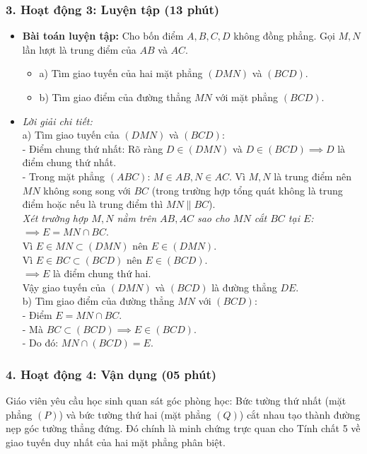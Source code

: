 \documentclass[12pt, a4paper]{article}
\begin{document}
\subsubsection*{3. Hoạt động 3: Luyện tập (13 phút)}
\begin{itemize}
    \item \textbf{Bài toán luyện tập:} Cho bốn điểm $A, B, C, D$ không đồng phẳng. Gọi $M, N$ lần lượt là trung điểm của $AB$ và $AC$.
    \begin{itemize}
        \item a) Tìm giao tuyến của hai mặt phẳng $(DMN)$ và $(BCD)$.
        \item b) Tìm giao điểm của đường thẳng $MN$ với mặt phẳng $(BCD)$.
    \end{itemize}
    \item \textit{Lời giải chi tiết:}\\
    a) Tìm giao tuyến của $(DMN)$ và $(BCD)$:\\
    - Điểm chung thứ nhất: Rõ ràng $D \in (DMN)$ và $D \in (BCD) \implies D$ là điểm chung thứ nhất.\\
    - Trong mặt phẳng $(ABC)$: $M \in AB, N \in AC$. Vì $M, N$ là trung điểm nên $MN$ không song song với $BC$ (trong trường hợp tổng quát không là trung điểm hoặc nếu là trung điểm thì $MN \parallel BC$).\\
    \textit{Xét trường hợp $M, N$ nằm trên $AB, AC$ sao cho $MN$ cắt $BC$ tại $E$:}\\
    $\implies E = MN \cap BC$.\\
    Vì $E \in MN \subset (DMN)$ nên $E \in (DMN)$.\\
    Vì $E \in BC \subset (BCD)$ nên $E \in (BCD)$.\\
    $\implies E$ là điểm chung thứ hai.\\
    Vậy giao tuyến của $(DMN)$ và $(BCD)$ là đường thẳng $DE$.\\
    b) Tìm giao điểm của đường thẳng $MN$ với $(BCD)$:\\
    - Điểm $E = MN \cap BC$.\\
    - Mà $BC \subset (BCD) \implies E \in (BCD)$.\\
    - Do đó: $MN \cap (BCD) = E$.
\end{itemize}

\subsubsection*{4. Hoạt động 4: Vận dụng (05 phút)}
Giáo viên yêu cầu học sinh quan sát góc phòng học: Bức tường thứ nhất (mặt phẳng $(P)$) và bức tường thứ hai (mặt phẳng $(Q)$) cắt nhau tạo thành đường nẹp góc tường thẳng đứng. Đó chính là minh chứng trực quan cho Tính chất 5 về giao tuyến duy nhất của hai mặt phẳng phân biệt.
\end{document}
